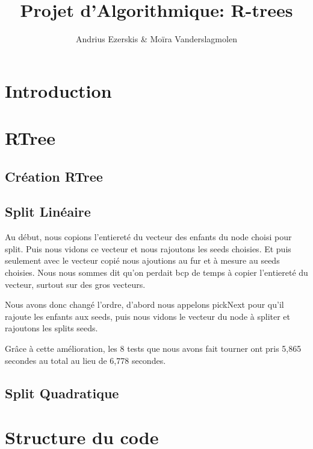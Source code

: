 \documentclass[utf8]{article}
\begin{document}
\begin{titlepage}


\author{Andrius Ezerskis \& Moïra Vanderslagmolen}
\title{Projet d'Algorithmique: R-trees}

\maketitle
\end{titlepage}
\tableofcontents
\newpage
\begin{large}



\section{Introduction}
\indent
\par


\par
\section{RTree}
\subsection{Création RTree}

\subsection{Split Linéaire}
Au début, nous copions l'entiereté du vecteur des enfants du node choisi pour
split. Puis nous vidons ce vecteur et nous rajoutons les seeds choisies. Et puis
seulement avec le vecteur copié nous ajoutions au fur et à mesure au seeds
choisies. Nous nous sommes dit qu'on perdait bcp de temps à copier l'entiereté
du vecteur, surtout sur des gros vecteurs.

Nous avons donc changé l'ordre, d'abord nous appelons pickNext pour qu'il
rajoute les enfants aux seeds, puis nous vidons le vecteur du node à spliter et
rajoutons les splits seeds.

Grâce à cette amélioration, les 8 tests que nous avons fait tourner ont pris
5,865 secondes au total au lieu de 6,778 secondes.
\subsection{Split Quadratique}


\section{Structure du code}


\end{large}
\end{document}
